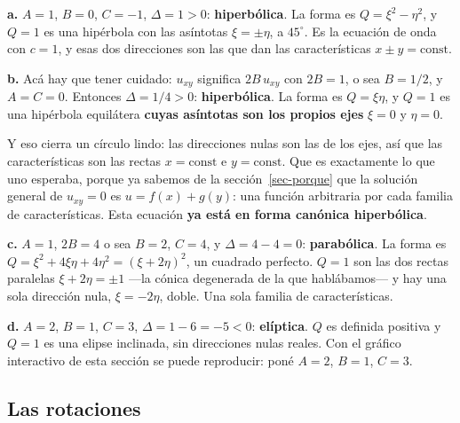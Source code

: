\documentclass[
  spanish,
  a4paper,
]{scrbook}
\theoremstyle{definition}
\theoremstyle{plain}
\theoremstyle{definition}
\theoremstyle{plain}
\theoremstyle{definition}
\theoremstyle{remark}
\begin{document}
\begin{tcolorbox}[enhanced jigsaw, arc=.35mm, bottomrule=.15mm, bottomtitle=1mm, breakable, colback=white, colbacktitle=quarto-callout-tip-color!10!white, colframe=quarto-callout-tip-color-frame, coltitle=black, left=2mm, leftrule=.75mm, opacityback=0, opacitybacktitle=0.6, rightrule=.15mm, title=\textcolor{quarto-callout-tip-color}{\faLightbulb}\hspace{0.5em}{Solución}, titlerule=0mm, toprule=.15mm, toptitle=1mm]

\textbf{a.} \(A=1\), \(B=0\), \(C=-1\), \(\Delta = 1 > 0\):
\textbf{hiperbólica}. La forma es \(Q = \xi^2 - \eta^2\), y \(Q=1\) es
una hipérbola con las asíntotas \(\xi = \pm\eta\), a \(45^\circ\). Es la
ecuación de onda con \(c=1\), y esas dos direcciones son las que dan las
características \(x \pm y = \text{const}\).

\textbf{b.} Acá hay que tener cuidado: \(u_{xy}\) significa
\(2B\,u_{xy}\) con \(2B=1\), o sea \(B = 1/2\), y \(A = C = 0\).
Entonces \(\Delta = 1/4 > 0\): \textbf{hiperbólica}. La forma es
\(Q = \xi\eta\), y \(Q = 1\) es una hipérbola equilátera \textbf{cuyas
asíntotas son los propios ejes} \(\xi=0\) y \(\eta=0\).

Y eso cierra un círculo lindo: las direcciones nulas son las de los
ejes, así que las características son las rectas \(x=\text{const}\) e
\(y=\text{const}\). Que es exactamente lo que uno esperaba, porque ya
sabemos de la sección~\ref{sec-porque} que la solución general de
\(u_{xy}=0\) es \(u = f(x) + g(y)\): una función arbitraria por cada
familia de características. Esta ecuación \textbf{ya está en forma
canónica hiperbólica}.

\textbf{c.} \(A=1\), \(2B=4\) o sea \(B=2\), \(C=4\), y
\(\Delta = 4-4 = 0\): \textbf{parabólica}. La forma es
\(Q = \xi^2+4\xi\eta+4\eta^2 = (\xi+2\eta)^2\), un cuadrado perfecto.
\(Q=1\) son las dos rectas paralelas \(\xi+2\eta = \pm 1\) ---la cónica
degenerada de la que hablábamos--- y hay una sola dirección nula,
\(\xi = -2\eta\), doble. Una sola familia de características.

\textbf{d.} \(A=2\), \(B=1\), \(C=3\), \(\Delta = 1-6 = -5 < 0\):
\textbf{elíptica}. \(Q\) es definida positiva y \(Q=1\) es una elipse
inclinada, sin direcciones nulas reales. Con el gráfico interactivo de
esta sección se puede reproducir: poné \(A=2\), \(B=1\), \(C=3\).

\end{tcolorbox}

\subsection{Las rotaciones}\label{sec-rotaciones}
\end{document}
